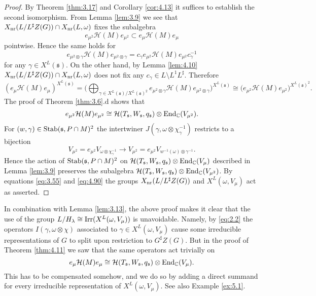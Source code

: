 \documentclass[11pt]{amsart}
\theoremstyle{definition}
\begin{document}
\begin{proof}
By Theorem \ref{thm:3.17} and Corollary \ref{cor:4.13}
it suffices to establish the second isomorphism.
From Lemma \ref{lem:3.9} we see that $X_{{\rm nr}} (L / L^\sharp Z(G)) \cap X_{{\rm nr}} (L,\omega)$ 
fixes the subalgebra
\[
e_{\mu^2} {{\mathcal H}} (M) e_{\mu^2} \subset e_{\mu } {{\mathcal H}} (M) e_{\mu }  
\]
pointwise. Hence the same holds for 
\[
e_{\mu^2 \otimes \gamma} {{\mathcal H}} (M) e_{\mu^2 \otimes \gamma}  = 
c_\gamma e_{\mu^2} {{\mathcal H}} (M) e_{\mu^2} c_\gamma^{-1}
\]
for any $\gamma \in X^L ({{\mathfrak s}})$. On the other hand, by Lemma \ref{lem:4.10}
$X_{{\rm nr}} (L / L^\sharp Z(G)) \cap X_{{\rm nr}} (L,\omega)$ does not fix any 
$c_\gamma \in L \setminus L^1 L^\sharp$. Therefore
\[
(e_{\mu } {{\mathcal H}} (M) e_{\mu } )^{X^L ({{\mathfrak s}})} = 
\Big( \bigoplus_{\gamma \in X^L ({{\mathfrak s}}) / X^L ({{\mathfrak s}})^2} \!\!\!\!
e_{\mu^2 \otimes \gamma} {{\mathcal H}} (M) e_{\mu^2 \otimes \gamma} \Big)^{X^L ({{\mathfrak s}})}
\cong \Big( e_{\mu^2} {{\mathcal H}} (M) e_{\mu^2} \Big)^{X^L ({{\mathfrak s}})^2} . 
\]
The proof of Theorem \ref{thm:3.6}.d shows that
\[
e_{\mu^2} {{\mathcal H}} (M) e_{\mu^2} \cong {{\mathcal H}} (T_{{\mathfrak s}},W_{{\mathfrak s}},q_{{\mathfrak s}}) \otimes 
{{\rm End}}_{\mathbb C} (V_{\mu^2}) .
\]
For $(w,\gamma) \in {{\rm Stab}} ({{\mathfrak s}},P \cap M)^2$ the intertwiner 
$J (\gamma, \omega \otimes \chi_\gamma^{-1})$ restricts to a bijection
\[
V_{\mu^2} = e_{\mu^2} V_{\omega \otimes \chi_\gamma^{-1}} \to
V_{\mu^2} = e_{\mu^2} V_{w^{-1} (\omega) \otimes \gamma^{-1}} .
\]
Hence the action of ${{\rm Stab}} ({{\mathfrak s}},P \cap M)^2$ on ${{\mathcal H}} (T_{{\mathfrak s}},W_{{\mathfrak s}},q_{{\mathfrak s}}) 
\otimes {{\rm End}}_{\mathbb C} (V_{\mu})$ described in Lemma \ref{lem:3.9} preserves the
subalgebra ${{\mathcal H}} (T_{{\mathfrak s}},W_{{\mathfrak s}},q_{{\mathfrak s}}) \otimes {{\rm End}}_{\mathbb C} (V_{\mu^2})$. 
By equations \eqref{eq:3.55} and \eqref{eq:4.90} the groups 
$X_{{\rm nr}} (L / L^\sharp Z(G))$ and $X^L (\omega,V_{\mu })$ act as asserted.
\end{proof}

In combination with Lemma \ref{lem:3.13},
the above proof makes it clear that the use of the group $L / H_\lambda \cong
{{\rm Irr}} (X^L (\omega,V_{\mu }))$ is unavoidable. Namely, by \eqref{eq:2.2} the operators 
$I(\gamma,\omega \otimes \chi)$ associated to $\gamma \in X^L (\omega,V_{\mu })$ 
cause some irreducible representations of $G$ to split upon restriction to
$G^\sharp Z(G)$. But in the proof of Theorem \ref{thm:4.11} we saw that the
same operators act trivially on 
\[
e_{\mu } {{\mathcal H}} (M) e_{\mu } \cong {{\mathcal H}} (T_{{\mathfrak s}}, W_{{\mathfrak s}}, q_{{\mathfrak s}}) \otimes {{\rm End}}_{\mathbb C} (V_\mu ) . 
\]
This has to be compensated somehow, and we do so by adding a direct
summand for every irreducible representation of $X^L (\omega,V_{\mu })$. See also
Example \ref{ex:5.1}.
\end{document}
